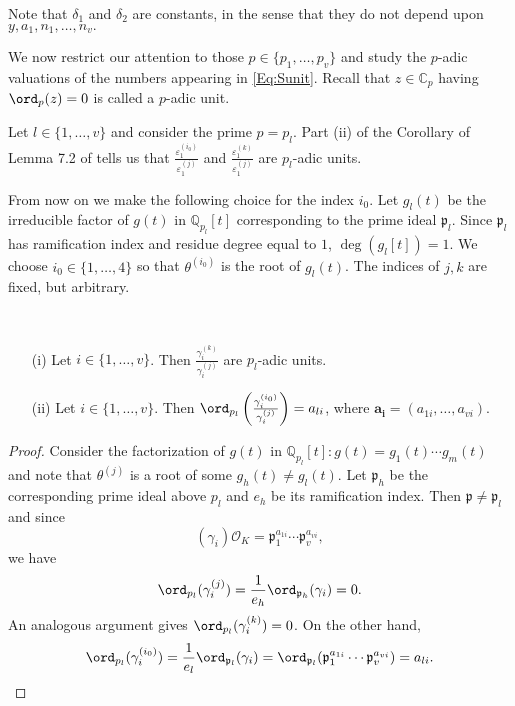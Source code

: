 {Note that $\delta_1$ and $\delta_2$ are constants, in the sense that they do not depend upon $y,a_1,n_1, \dots, n_v.$

We now restrict our attention to those $p \in \{p_1, \dots, p_v\}$ and study the $p$-adic valuations of the numbers appearing in \eqref{Eq:Sunit}. Recall that $z \in \mathbb{C}_p$ having $\ord_p(z) = 0$ is called a $p$-adic unit. 

Let $l \in \{1, \dots, v\}$ and consider the prime $p = p_l$. Part (ii) of the Corollary of Lemma 7.2 of \cite{TW3} tells us that $\frac{\varepsilon_1^{(i_0)}}{\varepsilon_1^{(j)}}$ and $\frac{\varepsilon_1^{(k)}}{\varepsilon_1^{(j)}}$ are $p_l$-adic units. 

From now on we make the following choice for the index $i_0$. Let $g_l(t)$ be the irreducible factor of $g(t)$ in $\mathbb{Q}_{p_l}[t]$ corresponding to the prime ideal $\mathfrak{p}_l$. Since $\mathfrak{p}_l$ has ramification index and residue degree equal to $1$, $\deg(g_l[t]) = 1$. We choose $i_0 \in \{1, \dots, 4\}$ so that $\theta^{(i_0)}$ is the root of $g_l(t)$. The indices of $j,k$ are fixed, but arbitrary. 

\begin{lemma} \label{Lem:units} \
\begin{enumerate}
\item[(i)] Let $i \in \{1, \dots, v\}$. Then $\frac{\gamma_i^{(k)}}{\gamma_i^{(j)}}$ are $p_l$-adic units. 
\item[(ii)] Let $i \in \{1, \dots, v\}$. Then $\ord_{p_l}\left(\frac{\gamma_i^{(i_0)}}{\gamma_i^{(j)}}\right) = a_{li}$, where $\mathbf{a_i} = (a_{1i}, \dots, a_{vi})$. 
\end{enumerate}
\end{lemma}

\begin{proof}
Consider the factorization of $g(t)$ in $\mathbb{Q}_{p_l}[t]: g(t) = g_1(t) \cdots g_m(t)$ and note that $\theta^{(j)}$ is a root of some $g_h(t) \neq g_l(t)$. Let $\mathfrak{p}_h$ be the corresponding prime ideal above $p_l$ and $e_h$ be its ramification index. Then $\mathfrak{p} \neq \mathfrak{p}_l$ and since 
\[(\gamma_i)\mathcal{O}_K = \mathfrak{p}_1^{a_{1i}} \cdots \mathfrak{p}_v^{a_{vi}},\]
we have 
\[\ord_{p_l}(\gamma_i^{(j)}) = \frac{1}{e_h}\ord_{\mathfrak{p}_h}(\gamma_i) = 0.\]
An analogous argument gives $\ord_{p_l}(\gamma_i^{(k)}) = 0$. On the other hand, 
\[\ord_{p_l}(\gamma_i^{(i_0)}) = \frac{1}{e_l}\ord_{\mathfrak{p}_l}(\gamma_i) = \ord_{\mathfrak{p}_l}(\mathfrak{p}_1^{a_{1i}} \cdots \mathfrak{p}_v^{a_{vi}}) = a_{li}.\]


\end{proof}}
